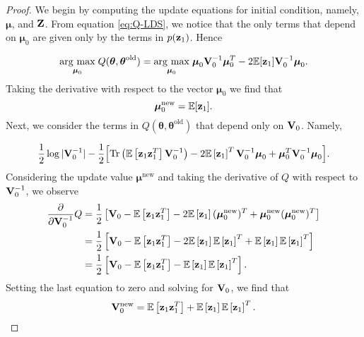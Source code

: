 \documentclass[11pt]{article}
\numberwithin{equation}{section}
\newcommand{\argmax}[1]{\underset{#1}{\operatorname{arg}\,\operatorname{max}}\;}
\newcommand{\expectation}[1]{\mathbb{E}\left[#1\right]}
\newcommand{\z}{{\bf z}}
\begin{document}
\begin{proof}
	We begin by computing the update equations for initial condition, namely, $\boldsymbol\mu$, and $\bf Z$. From equation \eqref{eq:Q-LDS}, we notice that the only terms that depend on $\boldsymbol{\mu}_0$ are given only by the terms in $p(\z_1)$. Hence

\begin{align}
	\argmax{\boldsymbol{\mu}_0} Q(\boldsymbol\theta, \boldsymbol\theta^\text{old}) = \argmax{\boldsymbol{\mu}_0} \boldsymbol{\mu}_0 {\bf V}_0^{-1}\boldsymbol{\mu}_0^T -2\mathbb{E}[{\z_1}]{\bf V}_0^{-1}\boldsymbol{\mu}_0.
\end{align}
Taking the derivative with respect to the vector $\boldsymbol{\mu}_0$ we find that
\begin{equation}
	\boldsymbol{\mu}_0^\text{new} = \mathbb{E}[{\z_1}].
\end{equation}
Next, we consider the terms in $Q(\boldsymbol\theta, \boldsymbol\theta^\text{old})$ that depend only on ${\bf V}_0$. Namely,

\begin{equation}
	\frac{1}{2}\log \vert
	  {\bf V}_0^{-1}\vert -\frac{1}{2}\Big[\text{Tr}\left(\mathbb{E}\left[\z_1 \z_1^T\right] {\bf V}_0^{-1}\right) -2 \mathbb{E}\left[\z_1\right]^T{\bf V}_0^{-1}\boldsymbol\mu_0 + \boldsymbol\mu_0^T {\bf V}_0^{-1}\boldsymbol\mu_0\Big].
\end{equation}
Considering the update value $\boldsymbol{\mu}^\text{new}$ and taking the derivative of $Q$ with respect to ${\bf V}_0^{-1}$, we observe
\begin{align}
	\frac{\partial}{\partial {\bf V}_0^{-1}} Q &= \frac{1}{2}\left[{\bf V}_0 - \expectation{\z_1 \z_1^T} - 2\expectation{\z_1} (\boldsymbol{\mu}_0^\text{new})^T + \boldsymbol{\mu}_0^\text{new} (\boldsymbol{\mu}_0^\text{new})^T \right] \nonumber \\
	&= \frac{1}{2} \left[{\bf V}_0 - \expectation{\z_1 \z_1^T} - 2\expectation{\z_1}\expectation{\z_1}^T + \expectation{\z_1}\expectation{\z_1}^T \right] \nonumber \\
	&= \frac{1}{2}\left[{\bf V}_0 - \expectation{\z_1 \z_1^T} - \expectation{\z_1}\expectation{\z_1}^T\right].
\end{align}
Setting the last equation to zero and solving for ${\bf V}_0$, we find that
\begin{equation}
	{\bf V}_0^\text{new} = \expectation{\z_1 \z_1^T} + \expectation{\z_1}\expectation{\z_1}^T.
\end{equation}
\end{proof}
\end{document}
